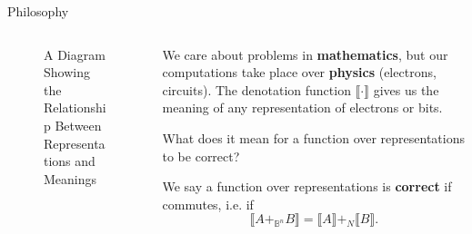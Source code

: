 \documentclass[aspectratio=169]{beamer}
\begin{document}
\begin{frame}[fragile]{Philosophy}
\begin{columns}
\begin{column}{0.5\textwidth}

  \begin{figure}
\caption{A Diagram Showing the Relationship Between Representations and Meanings}
\end{figure}

\end{column}
\begin{column}{0.5\textwidth}  %

We care about problems in \textbf{mathematics}, but our computations take place over \textbf{physics} (electrons, circuits).
\pause The denotation function $\llbracket \cdot \rrbracket$ gives us the meaning of any representation of electrons or bits.

\pause
\begin{qn}
What does it mean for a function over representations to be correct?
\end{qn}
\pause
\begin{thm}
  We say a function over representations is \textbf{correct} if  commutes, i.e. if
  \[\llbracket A +_{\mathbb{B}^{n}} B \rrbracket = \llbracket A \rrbracket +_{N} \llbracket B \rrbracket.\]
\end{thm}


\end{column}
\end{columns}
\end{frame}
\end{document}
